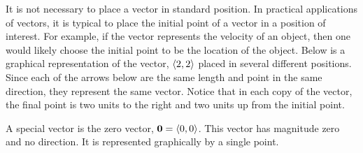 \documentclass[handout]{ximera}
\begin{document}
It is not necessary to place a vector in standard position.  
In practical applications of vectors, it is typical to place the initial point of a vector in a position of interest.  
For example, if the vector represents the velocity of an object, then one would likely choose the initial point to be the location of the object.
Below is a graphical representation of the vector, $\left\langle 2,2\right\rangle$ placed in several different positions.
Since each of the arrows below are the same length and point in the same direction, they represent the same vector.
Notice that in each copy of the vector, the final point is two units to the right and two units up from the initial point. 
\begin{image}
\end{image}



A special vector is the zero vector, $\mathbf{0} = \left\langle 0,0\right\rangle$.  
This vector has magnitude zero and no direction.  
It is represented graphically by a single point.

\begin{image}
\end{image}
\end{document}
